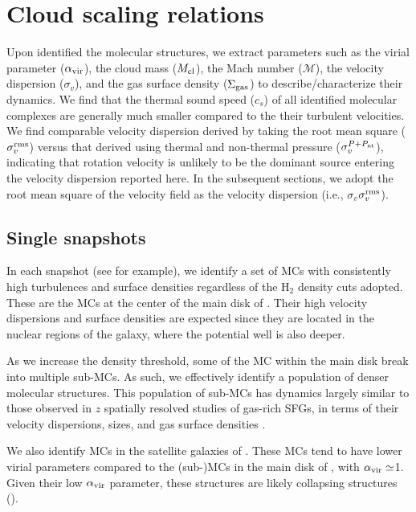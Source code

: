 \documentclass[apj]{emulateapj} %
\begin{document}
\section{Cloud scaling relations} \label{sec:results}
Upon identified the molecular structures, we extract parameters such as
the virial parameter ($\alpha_{\rm vir}$), 
the cloud mass ($M_{\rm cl}$), 
the Mach number ($\mathcal{M}$), 
the velocity dispersion ($\sigma_v$), and the 
gas surface density ($\Sigma_{\rm gas}$)
to describe/characterize their dynamics.
We find that the thermal sound speed ($c_s$) 
of all identified molecular complexes are generally much smaller compared to the their
turbulent velocities.
We find comparable velocity dispersion derived by taking the root mean square ($\sigma_v^{\rm rms}$) versus
that derived using thermal and non-thermal pressure ($\sigma_v^{P+P_{\rm nt}}$), indicating that 
rotation velocity is unlikely to be the dominant source entering the velocity dispersion reported here.
In the subsequent sections, we adopt the root mean square of the velocity field
as the velocity dispersion (i.e., $\sigma_v$\eq$\sigma_v^{\rm rms}$).

\subsection{Single snapshots}  \label{sec:singless}
In each snapshot (see  for example), 
we identify a set of MCs with consistently high turbulences and surface densities 
regardless of the H$_2$ density cuts adopted. 
These are the MCs at the center of the main disk of \flower.
Their high velocity dispersions and surface densities are expected since 
they are located in the nuclear regions of the 
galaxy, where the potential well is also deeper.

As we increase the density threshold, some of the MC within the main disk break 
into multiple sub-MCs.
As such, we effectively identify a population of denser molecular structures. 
This population of sub-MCs has dynamics largely
similar to those observed 
in $z$ spatially resolved studies of gas-rich SFGs, in
terms of their velocity dispersions, sizes, and gas surface densities \citep[e.g.,][]{Swinbank11a}.

We also identify MCs in the satellite galaxies of \flower. These MCs 
tend to have lower virial parameters compared to the (sub-)MCs in the main disk of \flower, 
with $\alpha_{\rm vir}\simeq$1.
Given their low $\alpha_{\rm vir}$ parameter,
these structures are likely collapsing structures (). 
\end{document}
